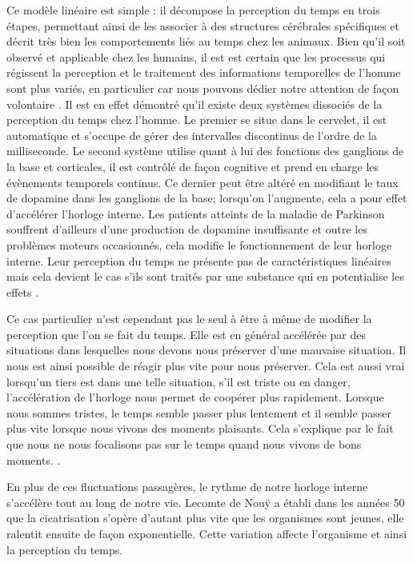 \documentclass[12pt,fleqn,oneside,french,openany]{book} %
\begin{document}
Ce modèle linéaire est simple : il décompose la perception du temps en trois étapes, permettant ainsi de les associer à des structures cérébrales spécifiques et décrit très bien les comportements liés au temps chez les animaux. Bien qu'il soit observé et applicable chez les humains, il est est certain que les processus qui régissent la perception et le traitement des informations temporelles de l'homme sont plus variés, en particulier car nous pouvons dédier notre attention de façon volontaire \cite{set}. Il est en effet démontré qu'il existe deux systèmes dissociés de la perception du temps chez l'homme. Le premier se situe dans le cervelet, il est automatique et s'occupe de gérer des intervalles discontinus de l'ordre de la milliseconde. Le second système utilise quant à lui des fonctions des ganglions de la base et corticales, il est contrôlé de façon cognitive et prend en charge les évènements temporels continus. Ce dernier peut être altéré en modifiant le taux de dopamine dans les ganglions de la base; lorsqu'on l'augmente, cela a pour effet d'accélérer l'horloge interne. Les patients atteints de la maladie de Parkinson souffrent d'ailleurs d'une production de dopamine insuffisante et outre les problèmes moteurs occasionnés, cela modifie le fonctionnement de leur horloge interne. Leur perception du temps ne présente pas de caractéristiques linéaires mais cela devient le cas s'ils sont traités par une substance qui en potentialise les effets \cite{buhusi2005}.

Ce cas particulier n'est cependant pas le seul à être à même de modifier la perception que l'on se fait du temps. Elle est en général accélérée par des situations dans lesquelles nous devons nous préserver d'une mauvaise situation. Il nous est ainsi possible de réagir plus vite pour nous préserver. Cela est aussi vrai lorsqu'un tiers est dans une telle situation, s'il est triste ou en danger, l'accélération de l'horloge nous permet de coopérer plus rapidement. Lorsque nous sommes tristes, le temps semble passer plus lentement et il semble passer plus vite lorsque nous vivons des moments plaisants. Cela s'explique par le fait que nous ne nous focalisons pas sur le temps quand nous vivons de bons moments. \cite{emotionsTemps,emotionsTemps2}.

En plus de ces fluctuations passagères, le rythme de notre horloge interne s'accélère tout au long de notre vie. Lecomte de Nouÿ a établi dans les années 50 que la cicatrisation s'opère d'autant plus vite que les organismes sont jeunes, elle ralentit ensuite de façon exponentielle. Cette variation affecte l'organisme et ainsi la perception du temps. \cite{quesaije}
\end{document}
